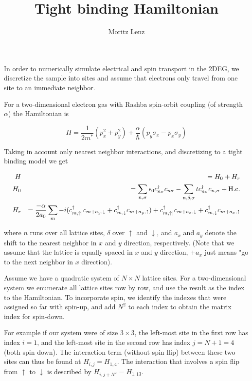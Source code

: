 \documentclass[11pt]{article}
\author{Moritz Lenz}
\title{Tight binding Hamiltonian}
\newcommand{\inp}[1]{\ensuremath{\left(#1\right)}}
\begin{document}
\maketitle

In order to numerically simulate electrical and spin transport in the 2DEG, we
discretize the sample into sites and assume that electrons only travel from
one site to an immediate neighbor.

For a two-dimensional electron gas with Rashba spin-orbit coupling (of
strength $\alpha$) the Hamiltonian is

\begin{equation}
    H = \frac{1}{2 m^*} (p_x^2 + p_y^2) + 
    \frac{\alpha}{\hbar} \inp{p_y\sigma_x - p_x\sigma_y}
\end{equation}

Taking in account only nearest neighbor interactions, and discretizing to a
tight binding model we get

\begin{eqnarray}
    H   &&= H_0 + H_r\\
    H_0 &&= \sum_{n,\sigma} \epsilon_0 c^{\dagger}_{n\sigma} c_{n\sigma}
            - \sum_{n,\delta,\sigma} t c^\dagger_{n\sigma} c_{n,\sigma} +
            \textnormal{H.c.}\\
    H_r &&= \frac{-\alpha}{2 a_0} \sum_m
        -i( c^\dagger_{m,\uparrow|} c_{m+a_y,\downarrow}
            + c^\dagger_{m,\downarrow} c_{m+a_y,\uparrow})
         + c^\dagger_{m,\uparrow|} c_{m+a_x,\downarrow}
            + c^\dagger_{m,\downarrow} c_{m+a_x,\uparrow}
\end{eqnarray}

where $n$ runs over all lattice sites, $\delta$ over $\uparrow$ and
$\downarrow$, and $a_x$ and $a_y$ denote the shift to the nearest neighbor in
$x$ and $y$ direction, respectively. (Note that we assume that the lattice is
equally spaced in $x$ and $y$ direction, $+a_x$ just means "go to the next
neighbor in $x$ direction).

Assume we have a quadratic system of $N \times N$ lattice sites.
For a two-dimensional system we enumerate all lattice sites row by row, and
use the result as the index to the Hamiltonian. To incorporate spin, we
identify the indexes that were assigned so far with spin-up, and add $N^2$ to
each index to obtain the matrix index for spin-down.

For example if our system were of size $3 \times 3$, the left-most site in the
first row has index $i = 1$, and the left-most site in the second row has
index $j = N + 1 = 4$ (both spin down). The interaction term (without spin
flip) between these two sites can thus be found at $H_{i,j} = H_{1,4}$. The
interaction that involves a spin flip from $\uparrow$ to $\downarrow$ is
described by $H_{i, j+N^2} = H_{1, 13}$.
\end{document}

